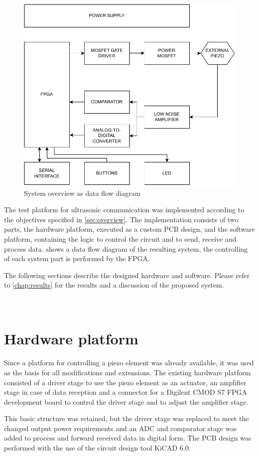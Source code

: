 \documentclass[
	english,
	ruledheaders=section, %
	class=report,%
	thesis={type=Project Seminar Report},%
	accentcolor=TUDa-1d, %
	custommargins=false,%
	marginpar=false,%
	parskip=half-,%
	fontsize=11pt,%
]{tudapub}
\begin{document}
\begin{figure}
    \vspace{-13pt}
    \centering
    \includegraphics[width=.55\columnwidth]{drawings/overview.pdf}
    \caption{System overview as data flow diagram}
    \label{drw:overview}
    \vspace{-40pt}
\end{figure}

The test platform for ultrasonic communication was implemented according to the objectives specified in \cref{sec:overview}. The implementation consists of two parts, the hardware platform, executed as a custom \gls{PCB} design, and the software platform, containing the logic to control the circuit and to send, receive and process data.  shows a data flow diagram of the resulting system, the controlling of each system part is performed by the \gls{FPGA}.

The following sections describe the designed hardware and software. Please refer to \cref{chap:results} for the results and a discussion of the proposed system.
\\\\\\


\section{Hardware platform}
Since a platform for controlling a piezo element was already available, it was used as the basis for all modifications and extensions. The existing hardware platform consisted of a driver stage to use the piezo element as an actuator, an amplifier stage in case of data reception and a connector for a Digilent CMOD S7 \gls{FPGA} development board to control the driver stage and to adjust the amplifier stage.

This basic structure was retained, but the driver stage was replaced to meet the changed output power requirements and an \gls{ADC} and comparator stage was added to process and forward received data in digital form. The \gls{PCB} design was performed with the use of the circuit design tool KiCAD 6.0.
\end{document}
